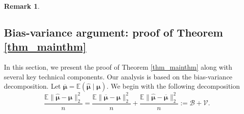 \documentclass[11pt]{article}
\newtheorem{remark}[theorem]{Remark}
\numberwithin{equation}{section}
\numberwithin{figure}{section}
\begin{document}
\begin{remark}
\end{remark}


%
%


\subsection{Bias-variance argument: proof of Theorem \ref{thm_mainthm}}
In this section, we present the proof of Theorem \ref{thm_mainthm} along with several key technical components. Our analysis is based on the bias-variance decomposition. Let $\overline{\bm{\mu}} = \mathbb{E}(\widehat{\bm{\mu}} \mid \bm{\mu})$. We begin with the following decomposition
\begin{equation}\label{eq_biasandvariancedefinition}
\frac{\mathbb{E} \| \widehat{\bm{\mu}}-\bm{\mu} \|_2^2}{n}=\frac{\mathbb{E}\| \overline{\bm{\mu}}-\bm{\mu}\|_2^2}{n}+\frac{\mathbb{E}\| \widehat{\bm{\mu}}-\overline{\bm{\mu}}\|_2^2}{n}:=\mathcal{B}+\mathcal{V}.
\end{equation}
\end{document}
